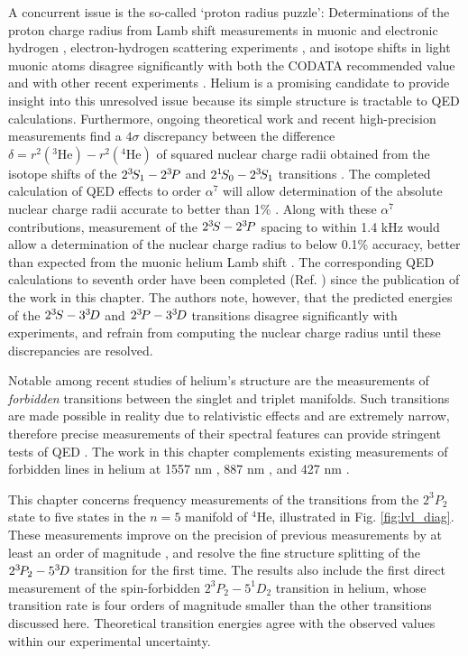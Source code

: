   A concurrent issue is the so-called `proton radius puzzle': Determinations of the proton charge radius from Lamb shift measurements in muonic and electronic hydrogen \cite{Pohl10, Bezginov19}, electron-hydrogen scattering experiments \cite{Beyer17,Xiong19}, and isotope shifts in light muonic atoms \cite{Kalinowski19,Pohl16} disagree significantly with both the CODATA recommended value and with other recent experiments \cite{Fleurbaey18}.
	 Helium is a promising candidate to provide insight into this unresolved issue because its simple structure is tractable to QED calculations.
	Furthermore, ongoing theoretical work \cite{Pachucki15,Pachucki17,Pachucki11,Pachucki10,Morton12,Morton06,Patkos16,Patkos17} and recent high-precision measurements \cite{Rooij11,Notermans14,Notermans16,Rengelink18} find a $4\sigma$ discrepancy between the difference $\delta = r^2(^3\textrm{He}) - r^2(^4\textrm{He})$ of squared nuclear charge radii obtained from the isotope shifts of the $2^{3\!}S_1 - 2^{3\!}P$ and ${2^{1\!}S_{0}} - 2^{3\!}S_1$ transitions \cite{Pachucki15,Patkos17}.
	The completed calculation of QED effects to order $\alpha^7$ will allow determination of the absolute nuclear charge radii accurate to better than 1\% \cite{Pachucki17}.
	Along with these $\alpha^7$ contributions, measurement of the $2^{3\!} S-2^{3\!} P$ spacing to within 1.4 kHz would allow a determination of the nuclear charge radius to below 0.1\% accuracy, better than expected from the muonic helium Lamb shift \cite{Wienczek19}.
	The corresponding QED calculations to seventh order have been completed (Ref. \cite{Patkos21}) since the publication of the work in this chapter. 
	The authors note, however, that the predicted energies of the $2^{3\!} S - 3 ^{3\!} D$ and $2^{3\!} P - 3 ^{3\!} D$ transitions disagree significantly with experiments, and refrain from computing the nuclear charge radius until these discrepancies are resolved.
	 
  Notable among recent studies of helium's structure are the measurements of \emph{forbidden} transitions between the singlet and triplet manifolds.
	Such transitions are made possible in reality due to relativistic effects and are extremely narrow, therefore precise measurements of their spectral features can provide stringent tests of QED \cite{Lach01}.
	The work in this chapter complements existing measurements of forbidden lines in helium at 1557 nm \cite{Rooij11,Rengelink18}, 887 nm \cite{Notermans14}, and 427 nm \cite{Thomas20}.

	This chapter concerns frequency measurements of the transitions from the $2^3P_2$ state to five states in the $n=5$ manifold of $^4$He, illustrated in Fig.
	\ref{fig:lvl_diag}.
	These measurements improve on the precision of previous measurements by at least an order of magnitude \cite{Martin60}, and resolve the fine structure splitting of the $2^{3\!}P_2 - 5^{3\!} D$ transition for the first time.
	The results also include the first direct measurement of the spin-forbidden $2^{3\!}P_2 - 5^{1\!}D_2$ transition in helium, whose transition rate is four orders of magnitude smaller than the other transitions discussed here.  
	Theoretical transition energies agree with the observed values within our experimental uncertainty.


